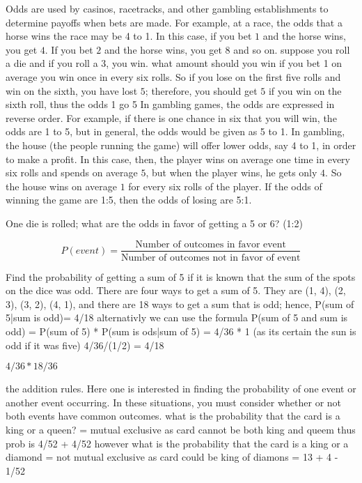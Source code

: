 Odds are used by casinos, racetracks, and other gambling establishments to determine payoffs when bets are made. For example, at a race, the odds that a horse wins the race may be 4 to 1. In this case, if you bet $1$ and the horse wins, you get $4$. If you bet $2$ and the horse wins, you get $8$ and so on. suppose you roll a die and if you roll a 3, you win. what amount should you win if you bet 1 on average you win once in every six rolls. So if you lose on the first five rolls and win on the sixth, you have lost $5$; therefore, you should get $5$ if you win on the sixth roll, thus the odds 1 go 5 In gambling games, the odds are expressed in reverse order. For example, if there is one chance in six that you will win, the odds are 1 to 5, but in general, the odds would be given as 5 to 1. In gambling, the house (the people running the game) will offer lower odds, say 4 to 1, in order to make a profit. In this case, then, the player wins on average one time in every six rolls and spends on average $5$, but when the player wins, he gets only $4$. So the house wins on average $1$ for every six rolls of the player. If the odds of winning the game are 1:5, then the odds of losing are 5:1.

One die is rolled; what are the odds in favor of getting a 5 or 6? (1:2)

\begin{equation}\label{prob:odds}
P(event) = \frac{\text{Number of outcomes in favor event}}{\text{Number of outcomes not in favor of event}}
\end{equation}

Find the probability of getting a sum of 5 if it is known that the sum of the spots on the dice was odd. There are four ways to get a sum of 5. They are (1, 4), (2, 3), (3, 2), (4, 1), and there are 18 ways to get a sum that is odd; hence, P(sum of 5|sum is odd)= 4/18 alternativly we can use the formula P(sum of 5 and sum is odd) = P(sum of 5) * P(sum is ods|sum of 5) = 4/36 * 1 (as its certain the sun is odd if it was five) 4/36/(1/2) = 4/18

$4/36 * 18/36$

the addition rules. Here one is interested in finding the probability of one event or another event occurring. In these situations, you must consider whether or not both events have common outcomes.
what is the probability that the card is a king or a queen? = mutual exclusive as card cannot be both king and queem thus prob is 4/52 + 4/52 however what is the probability that the card is a king or a diamond = not mutual exclusive as card could be king of diamons = 13 + 4 - 1/52

